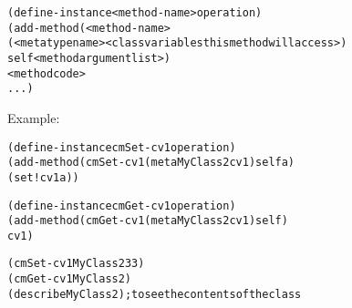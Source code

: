 \documentclass[12pt]{article}
\begin{document}
\begin{alltt}
   (define-instance <method-name> operation)
   (add-method (<method-name>
                     (<meta type name>  <class variables this method will access>)
                     self  <method argument list>)
               <method code>
               ...)
\end{alltt}

\newpage

Example:

\begin{alltt}
   (define-instance cmSet-cv1 operation)
   (add-method (cmSet-cv1 (metaMyClass2 cv1) self a)
               (set! cv1 a))
  
   (define-instance cmGet-cv1 operation)
   (add-method (cmGet-cv1 (metaMyClass2 cv1) self)
               cv1)

   (cmSet-cv1 MyClass2 33)
   (cmGet-cv1 MyClass2)
   (describe MyClass2)  ; to see the contents of the class
\end{alltt}


\label{lastpage}
\end{document}
